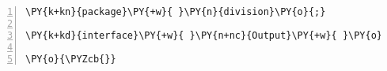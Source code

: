 \begin{Verbatim}[commandchars=\\\{\},numbers=left,firstnumber=1,stepnumber=1,frame=single,fontsize=\small]
\PY{k+kn}{package}\PY{+w}{ }\PY{n}{division}\PY{o}{;}

\PY{k+kd}{interface}\PY{+w}{ }\PY{n+nc}{Output}\PY{+w}{ }\PY{o}{\PYZob{}}

\PY{o}{\PYZcb{}}
\end{Verbatim}
